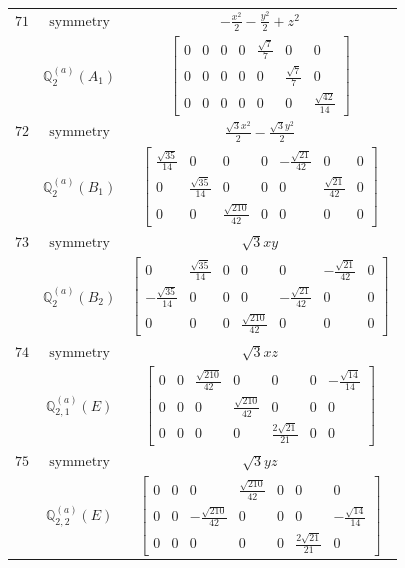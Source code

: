 \documentclass[fleqn,8pt,landscape]{jsarticle}
\begin{document}
\begin{longtable}{ccc}
$ 71 $ & $ \text{symmetry} $ & $ - \frac{x^{2}}{2} - \frac{y^{2}}{2} + z^{2} $ \\
$  $ & $ \mathbb{Q}_{2}^{(a)}(A_{1}) $ & $ \begin{bmatrix} 0 & 0 & 0 & 0 & \frac{\sqrt{7}}{7} & 0 & 0 \\ 0 & 0 & 0 & 0 & 0 & \frac{\sqrt{7}}{7} & 0 \\ 0 & 0 & 0 & 0 & 0 & 0 & \frac{\sqrt{42}}{14} \end{bmatrix} $ \\ \hline
$ 72 $ & $ \text{symmetry} $ & $ \frac{\sqrt{3} x^{2}}{2} - \frac{\sqrt{3} y^{2}}{2} $ \\
$  $ & $ \mathbb{Q}_{2}^{(a)}(B_{1}) $ & $ \begin{bmatrix} \frac{\sqrt{35}}{14} & 0 & 0 & 0 & - \frac{\sqrt{21}}{42} & 0 & 0 \\ 0 & \frac{\sqrt{35}}{14} & 0 & 0 & 0 & \frac{\sqrt{21}}{42} & 0 \\ 0 & 0 & \frac{\sqrt{210}}{42} & 0 & 0 & 0 & 0 \end{bmatrix} $ \\ \hline
$ 73 $ & $ \text{symmetry} $ & $ \sqrt{3} x y $ \\
$  $ & $ \mathbb{Q}_{2}^{(a)}(B_{2}) $ & $ \begin{bmatrix} 0 & \frac{\sqrt{35}}{14} & 0 & 0 & 0 & - \frac{\sqrt{21}}{42} & 0 \\ - \frac{\sqrt{35}}{14} & 0 & 0 & 0 & - \frac{\sqrt{21}}{42} & 0 & 0 \\ 0 & 0 & 0 & \frac{\sqrt{210}}{42} & 0 & 0 & 0 \end{bmatrix} $ \\ \hline
$ 74 $ & $ \text{symmetry} $ & $ \sqrt{3} x z $ \\
$  $ & $ \mathbb{Q}_{2,1}^{(a)}(E) $ & $ \begin{bmatrix} 0 & 0 & \frac{\sqrt{210}}{42} & 0 & 0 & 0 & - \frac{\sqrt{14}}{14} \\ 0 & 0 & 0 & \frac{\sqrt{210}}{42} & 0 & 0 & 0 \\ 0 & 0 & 0 & 0 & \frac{2 \sqrt{21}}{21} & 0 & 0 \end{bmatrix} $ \\ \hline
$ 75 $ & $ \text{symmetry} $ & $ \sqrt{3} y z $ \\
$  $ & $ \mathbb{Q}_{2,2}^{(a)}(E) $ & $ \begin{bmatrix} 0 & 0 & 0 & \frac{\sqrt{210}}{42} & 0 & 0 & 0 \\ 0 & 0 & - \frac{\sqrt{210}}{42} & 0 & 0 & 0 & - \frac{\sqrt{14}}{14} \\ 0 & 0 & 0 & 0 & 0 & \frac{2 \sqrt{21}}{21} & 0 \end{bmatrix} $ \\ \hline

\end{longtable}
\end{document}
